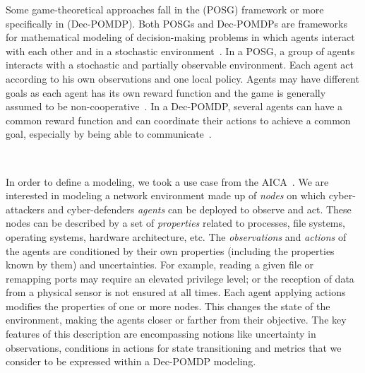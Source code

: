 \noindent
Some game-theoretical approaches fall in the  (POSG) framework or more specifically in  (Dec-POMDP). Both POSGs and Dec-POMDPs are frameworks for mathematical modeling of decision-making problems in which agents interact with each other and in a stochastic environment~\cite{beynier2010}. In a POSG, a group of agents interacts with a stochastic and partially observable environment. Each agent act according to his own observations and one local policy. Agents may have different goals as each agent has its own reward function and the game is generally assumed to be non-cooperative~\cite{jk2020}. In a Dec-POMDP, several agents can have a common reward function and can coordinate their actions to achieve a common goal, especially by being able to communicate~\cite{bernstein2013}.

\



\noindent
In order to define a modeling, we took a use case from the AICA~\cite{theron_autonomous_2021}. We are interested in modeling a network environment made up of \textit{nodes} on which cyber-attackers and cyber-defenders \textit{agents} can be deployed to observe and act. These nodes can be described by a set of \textit{properties} related to processes, file systems, operating systems, hardware architecture, etc.
The \textit{observations} and \textit{actions} of the agents are conditioned by their own properties (including the properties known by them) and uncertainties. For example, reading a given file or remapping ports may require an elevated privilege level; or the reception of data from a physical sensor is not ensured at all times.
Each agent applying actions modifies the properties of one or more nodes. This changes the state of the environment, making the agents closer or farther from their objective.
The key features of this description are encompassing notions like uncertainty in observations, conditions in actions for state transitioning and metrics that we consider to be expressed within a Dec-POMDP modeling.

